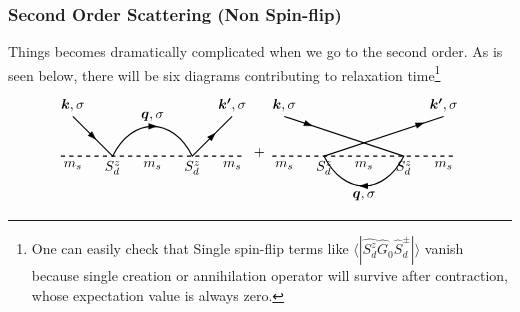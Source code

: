 \documentclass[10pt,aspectratio=43,xcolor=x11names]{beamer}%
\begin{document}
		\begin{frame}\frametitle{Second Order Scattering (Non Spin-flip)}
			Things becomes dramatically complicated when we go to the second order. As is seen below, there will be six diagrams contributing to relaxation time\footnote{One can easily check that Single spin-flip terms like $\langle|\hat{S_d^z}\hat{G}_0\hat{S}_d^\pm|\rangle$ vanish because single creation or annihilation operator will survive after contraction, whose expectation value is always zero.}
			\begin{equation*}
				\begin{tikzpicture}[baseline]
					\draw[thick,dashed] (-2.3,0)--(2.3,0);
					\draw[thick] (-2,1)--(-1,0) .. controls (-0.5,1) and (0.5,1) ..(1,0)--(2,1);
					\node[below] at (2,0) {$m_s$};
					\node[below] at (-2,0) {$m_s$};
					\node[below] at (0,0) {$m_s$};
					\node[below] at (1,0) {$S_d^z$};
					\node[below] at (-1,0) {$S_d^z$};
					\node[rotate=-45] at (-1.5,0.5) {\arrow};
					\node at (0,0.75) {\arrow};
					\node at (0,1) {$\bm{q},\sigma$};
					\node[above] at (-2,1) {$\bm{k},\sigma$};
					\node[above] at (2,1) {$\bm{k'},\sigma$};
					\node[rotate=45] at (1.5,0.5) {\arrow};
				\end{tikzpicture}+
				\begin{tikzpicture}[baseline]
					\draw[thick,dashed] (-2.3,0)--(2.3,0);
					\draw[thick] (-2,1)--(1,0) .. controls (0.5,-1) and (-0.5,-1) .. (-1,0)--(2,1);
					\node[below] at (2,0) {$m_s$};
					\node[below] at (-2,0) {$m_s$};
					\node[below] at (0,0) {$m_s$};
					\node[below] at (1,0) {$S_d^z$};
					\node[below] at (-1,0) {$S_d^z$};
					\node[rotate=-20] at (-1.4,0.8) {\arrow};
					\node[rotate=180] at (0,-0.75) {\arrow};
					\node at (0,-1) {$\bm{q},\sigma$};
					\node[above] at (-2,1) {$\bm{k},\sigma$};
					\node[above] at (2,1) {$\bm{k'},\sigma$};
					\node[rotate=20] at (1.4,0.8) {\arrow};
				\end{tikzpicture}
			\end{equation*}
			
		\end{frame}
\end{document}
